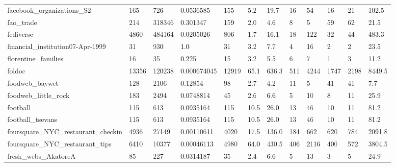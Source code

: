 \begin{longtable}{llllllllllll}
 facebook\_organizations\_S2                          & 165        & 726       & 0.0536585   & 155   & 5.2    & 19.7   & 16    & 54     & 16     & 21     & 102.5   \\
 fao\_trade                                          & 214        & 318346    & 0.301347    & 159   & 2.0    & 4.6    & 8     & 5      & 59     & 62     & 21.5    \\
 fediverse                                          & 4860       & 484164    & 0.0205026   & 806   & 1.7    & 16.1   & 18    & 122    & 32     & 44     & 483.3   \\
 financial\_institution07-Apr-1999                   & 31         & 930       & 1.0         & 31    & 3.2    & 7.7    & 4     & 16     & 2      & 2      & 23.5    \\
 florentine\_families                                & 16         & 35        & 0.225       & 15    & 3.2    & 5.5    & 6     & 7      & 1      & 3      & 11.2    \\
 foldoc                                             & 13356      & 120238    & 0.000674045 & 12919 & 65.1   & 636.3  & 511   & 4244   & 1747   & 2198   & 8449.5  \\
 foodweb\_baywet                                     & 128        & 2106      & 0.12854     & 98    & 2.7    & 4.2    & 11    & 5      & 41     & 41     & 7.7     \\
 foodweb\_little\_rock                                & 183        & 2494      & 0.0748814   & 45    & 2.6    & 6.6    & 5     & 10     & 8      & 11     & 25.9    \\
 football                                           & 115        & 613       & 0.0935164   & 115   & 10.5   & 26.0   & 13    & 46     & 10     & 11     & 81.2    \\
 football\_tsevans                                   & 115        & 613       & 0.0935164   & 115   & 10.5   & 26.0   & 13    & 46     & 10     & 11     & 81.2    \\
 foursquare\_NYC\_restaurant\_checkin                  & 4936       & 27149     & 0.00110611  & 4020  & 17.5   & 136.0  & 184   & 662    & 620    & 784    & 2091.8  \\
 foursquare\_NYC\_restaurant\_tips                     & 6410       & 10377     & 0.00046113  & 4980  & 64.0   & 430.5  & 406   & 2116   & 400    & 572    & 3804.5  \\
 fresh\_webs\_AkatoreA                                & 85         & 227       & 0.0314187   & 35    & 2.4    & 6.6    & 5     & 13     & 3      & 5      & 24.9    \\

\end{longtable}
